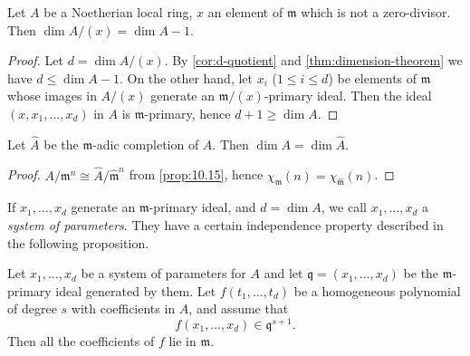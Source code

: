 \begin{corollary}\label{cor:dim-quotient}
Let $A$ be a Noetherian local ring, $x$ an element of $\mathfrak{m}$ which is not a zero-divisor. Then $\dim A/(x) = \dim A - 1$.
\end{corollary}

\begin{proof}
Let $d = \dim A/(x)$. By \eqref{cor:d-quotient} and \eqref{thm:dimension-theorem} we have $d \leq \dim A - 1$. On the other hand, let $x_i$ ($1 \leq i \leq d$) be elements of $\mathfrak{m}$ whose images in $A/(x)$ generate an $\mathfrak{m}/(x)$-primary ideal. Then the ideal $(x, x_1, \ldots, x_d)$ in $A$ is $\mathfrak{m}$-primary, hence $d + 1 \geq \dim A$.
\end{proof}

\begin{corollary}\label{cor:dim-completion}
Let $\widehat{A}$ be the $\mathfrak{m}$-adic completion of $A$. Then $\dim A = \dim \widehat{A}$.
\end{corollary}

\begin{proof}
$A/\mathfrak{m}^n \cong \widehat{A}/\widehat{\mathfrak{m}}^n$ from \eqref{prop:10.15}, hence $\chi_{\mathfrak{m}}(n) = \chi_{\widehat{\mathfrak{m}}}(n)$.
\end{proof}

If $x_1, \ldots, x_d$ generate an $\mathfrak{m}$-primary ideal, and $d = \dim A$, we call $x_1, \ldots, x_d$ a \emph{system of parameters}. They have a certain independence property described in the following proposition.

\begin{proposition}\label{prop:system-parameters}
Let $x_1, \ldots, x_d$ be a system of parameters for $A$ and let $\mathfrak{q} = (x_1, \ldots, x_d)$ be the $\mathfrak{m}$-primary ideal generated by them. Let $f(t_1, \ldots, t_d)$ be a homogeneous polynomial of degree $s$ with coefficients in $A$, and assume that
\[
    f(x_1, \ldots, x_d) \in \mathfrak{q}^{s+1}.
\]
Then all the coefficients of $f$ lie in $\mathfrak{m}$.
\end{proposition}

